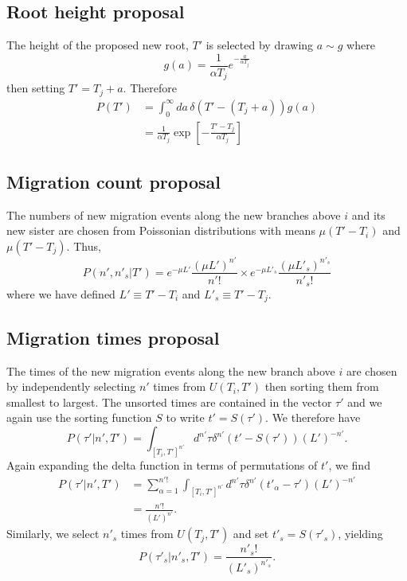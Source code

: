 \documentclass[a4paper,11pt]{article}
\begin{document}
\subsection{Root height proposal}

The height of the proposed new root, $T'$ is selected by drawing
$a\sim g$ where
\begin{equation}
g(a)=\frac{1}{\alpha T_j}e^{-\frac{a}{\alpha T_j}}
\end{equation}
then setting $T'=T_j+a$. Therefore
\begin{align}
  P(T')&=\int_0^\infty da\, \delta(T'-(T_j+a))g(a)\nonumber\\
&=\frac{1}{\alpha T_j}\exp\left[-\frac{T'-T_j}{\alpha T_j}\right]
\end{align}

\subsection{Migration count proposal}

The numbers of new migration events along the new branches above $i$
and its new sister are chosen from Poissonian distributions with means
$\mu(T'-T_i)$ and $\mu(T'-T_j)$.  Thus,
\begin{equation}
  P(n',n'_s|T')=e^{-\mu L'}\frac{(\mu L')^{n'}}{n'!}
  \times e^{-\mu L'_s}\frac{(\mu L'_s)^{n'_s}}{n'_s!}
\end{equation}
where we have defined $L'\equiv T'-T_i$ and $L'_s\equiv T'-T_j$.

\subsection{Migration times proposal}

The times of the new migration events along the new branch above $i$
are chosen by independently selecting $n'$ times from $U(T_i,T')$ then
sorting them from smallest to largest.  The unsorted times are
contained in the vector $\tau'$ and we again use the sorting function
$S$ to write $t'=S(\tau')$.  We therefore have
\begin{equation}
  P(\tau'|n',T')=\int_{[T_i,T']^{n'}}d^{n'}\tau\delta^{n'}(t'-S(\tau'))(L')^{-n'}.
\end{equation}
Again expanding the delta function in terms of permutations of $t'$,
we find
\begin{align}
P(\tau'|n',T')&=\sum_{\alpha=1}^{n'!}\int_{[T_i,T']^{n'}}d^{n'}\tau\delta^{n'}(t'_\alpha-\tau')(L')^{-n'}\nonumber\\
&=\frac{n'!}{(L')^{n'}}.
\end{align}
Similarly, we select $n'_s$ times from $U(T_j,T')$ and set
$t'_s=S(\tau'_s)$, yielding
\begin{equation}
  P(\tau'_s|n'_s,T')=\frac{n'_s!}{(L'_s)^{n'_s}}.
\end{equation}
\end{document}

